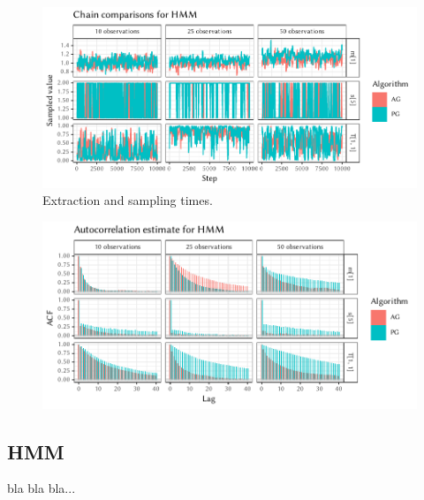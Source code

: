 \begin{figure}[p]
  \par
  \includegraphics[width=\textwidth]{figures/HMM-chains}
  \caption{Extraction and sampling times.}
\end{figure}

\cleartorecto
\FloatBlock

\begin{figure}[t]
  \centering
  \includegraphics[width=\textwidth]{figures/HMM-acfs}
  \label{fig:plots-hmm}
\end{figure}

\subsection*{HMM}

bla bla bla...

\cleartoverso
\FloatBlock

